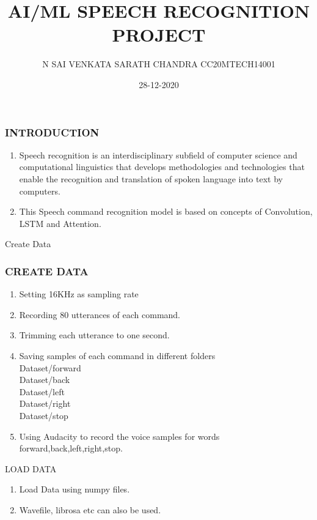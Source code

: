 \documentclass[11pt]{beamer}
\author{N SAI VENKATA SARATH CHANDRA 
CC20MTECH14001}
\title{AI/ML SPEECH RECOGNITION PROJECT}
\institute[IIT-H]
{
\\Guided by:\\Dr G.V.V.SHARMA
}
\date{28-12-2020}
\begin{document}
\begin{frame}
\titlepage
\end{frame}



\begin{frame}
\frametitle{INTRODUCTION}
\begin{enumerate}
    \item Speech recognition is an interdisciplinary subfield of computer science and computational linguistics that develops methodologies and technologies that enable the recognition and translation of spoken language into text by computers.
    \item This Speech command recognition model is based on concepts of Convolution, LSTM and Attention.
\end{enumerate}




 



\end{frame}

\begin{frame}{Create Data}
\frametitle{CREATE DATA}
\begin{enumerate}
 \item Setting 16KHz as sampling rate
    \item Recording 80 utterances of each command.
    \item Trimming each utterance to one second.
    \item Saving samples of each command in different folders\\
         Dataset/forward\\
         Dataset/back\\
         Dataset/left\\
         Dataset/right\\
         Dataset/stop
    \item Using Audacity to record the voice samples for words forward,back,left,right,stop.
\end{enumerate}


\end{frame}

\begin{frame}
{LOAD DATA}
\begin{enumerate}
    \item Load Data using numpy files.
    \item Wavefile, librosa etc can also be used.
\end{enumerate}
   
\end{frame}
\end{document}
